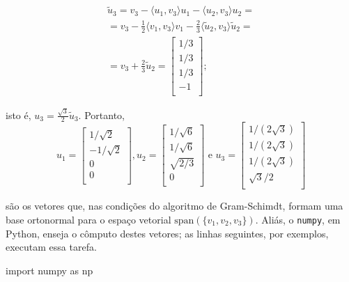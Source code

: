 \documentclass[leqno]{article}
\begin{document}
\begin{enumerate}
\begin{sol}
	\begin{equation*} 
		\begin{split} 
			\tilde u_{3} = v_{3} - \langle u_{1}, v_{3} \rangle u_{1} - \langle u_{2}, v_{3} \rangle u_{2} = \\ 
			= v_{3} - \frac{1}{2} \langle v_{1}, v_{3} \rangle v_{1} - \frac{2}{3} \langle \tilde u_{2}, v_{3} \rangle \tilde u_{2} = \\ 
			= v_{3} + \frac{2}{3} \tilde u_{2} = 
			\begin{bmatrix} 
				1/3 \\ 
				1/3 \\ 
				1/3 \\ 
				-1  \\ 
			\end{bmatrix}; 
		\end{split}    
	\end{equation*} 
	
	\noindent isto é, $u_{3} = \frac{\sqrt{3}}{2} \tilde u_{3}$. Portanto, 
	\begin{equation*} 
		u_{1} = 
		\begin{bmatrix} 
			1/\sqrt{2} \\ 
			-1/\sqrt{2} \\ 
			0 \\ 
			0 \\ 
		\end{bmatrix}, 
		u_{2} = 
		\begin{bmatrix} 
			1/\sqrt{6} \\ 
			1/\sqrt{6} \\ 
			\sqrt{2/3} \\ 
			0 \\ 
		\end{bmatrix} 
		\text{ e } 
		u_{3} = 
		\begin{bmatrix} 
			1/(2\sqrt{3}) \\ 
			1/(2\sqrt{3}) \\ 
			1/(2\sqrt{3}) \\ 
			\sqrt{3}/2 \\ 
		\end{bmatrix} 
	\end{equation*} 

	\noindent são os vetores que, nas condições do algoritmo de Gram-Schimdt, formam uma base ortonormal para o espaço vetorial $\mathrm{span}(\{v_{1}, v_{2}, v_{3}\})$. Aliás, o \texttt{numpy}, em Python, enseja o cômputo destes vetores; as linhas seguintes, por exemplos, executam essa tarefa. 

\begin{python} 
import numpy as np 


\end{python}
\end{sol}
\end{enumerate}
\end{document}
